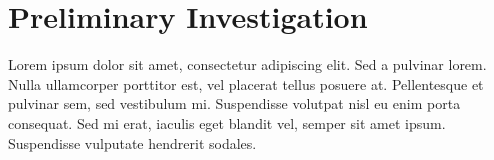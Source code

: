 \chapter{Preliminary Investigation}
Lorem ipsum dolor sit amet, consectetur adipiscing elit. Sed a pulvinar lorem. Nulla ullamcorper porttitor est, vel placerat tellus posuere at. Pellentesque et pulvinar sem, sed vestibulum mi. Suspendisse volutpat nisl eu enim porta consequat. Sed mi erat, iaculis eget blandit vel, semper sit amet ipsum. Suspendisse vulputate hendrerit sodales.



